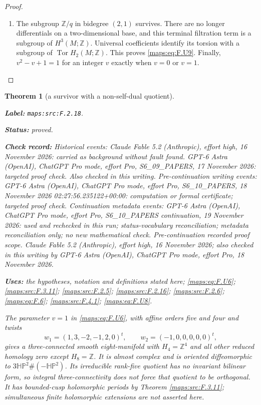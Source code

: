 \documentclass[11pt,a4paper]{article}
\newtheorem{theorem}{Theorem}[section]
\theoremstyle{definition}
\newcommand{\StatementRecord}[4]{\par\smallskip\begingroup\upshape\raggedright\noindent\textbf{Label:} \nolinkurl{#1}.\par\noindent\textbf{Status:} #2.\par\noindent\textbf{Check record:} #3.\par\noindent\textbf{Uses:} #4.\par\endgroup\smallskip}
\begin{document}
\begin{proof}
\begin{enumerate}[label=\arabic*.]
\item The subgroup $\mathbb Z/q$ in bidegree $(2,1)$ survives.
There are no longer differentials on a two-dimensional base,
and this terminal filtration term is a subgroup of
$H^3(M;\mathbb Z)$.  Universal coefficients identify its
torsion with a subgroup of $\operatorname{Tor}H_2(M;\mathbb Z)$.
This proves \eqref{maps:eq:F.U9}.  Finally, $v^2-v+1=1$ for an integer $v$
exactly when $v=0$ or $v=1$.

\end{enumerate}
\end{proof}




\begin{theorem}[a survivor with a non-self-dual quotient]\label{maps:src:F.2.18}
\StatementRecord{maps:src:F.2.18}{proved}{Historical events: Claude Fable 5.2 (Anthropic), effort high, 16 November 2026: carried as background without fault found. GPT-6 Astra (OpenAI), ChatGPT Pro mode, effort Pro, S6\_09\_PAPERS, 17 November 2026: targeted proof check. Also checked in this writing. Pre-continuation writing events: GPT-6 Astra (OpenAI), ChatGPT Pro mode, effort Pro, S6\_10\_PAPERS, 18 November 2026 02:27:56.235122+00:00: computation or formal certificate; targeted proof check. Continuation metadata events: GPT-6 Astra (OpenAI), ChatGPT Pro mode, effort Pro, S6\_10\_PAPERS continuation, 19 November 2026: used and rechecked in this run; status-vocabulary reconciliation; metadata reconciliation only; no new mathematical check. \emph{Pre-continuation recorded proof scope.} Claude Fable 5.2 (Anthropic), effort high, 16 November 2026; also checked in this writing by GPT-6 Astra (OpenAI), ChatGPT Pro mode, effort Pro, 18 November 2026}{the hypotheses, notation and definitions stated here; \cref{maps:eq:F.U6}; \cref{maps:src:F.3.11}; \cref{maps:src:F.2.5}; \cref{maps:src:F.2.16}; \cref{maps:src:F.2.6}; \cref{maps:eq:F.6}; \cref{maps:src:F.4.1}; \cref{maps:eq:F.U8}}


The parameter $v=1$ in \eqref{maps:eq:F.U6}, with affine orders five and four
and twists
\[
 w_1=(1,3,-2,-1,2,0)^t,\qquad
 w_2=(-1,0,0,0,0,0)^t,
\]
gives a three-connected smooth eight-manifold with
$H_4=\mathbb Z^4$ and all other reduced homology zero except
$H_8=\mathbb Z$.  It is almost complex and is oriented
diffeomorphic to $3\mathbb{HP}^2\#(-\mathbb{HP}^2)$.
Its irreducible rank-five quotient has no invariant bilinear
form, so integral three-connectivity does not force that
quotient to be orthogonal.  It has bounded-cusp holomorphic
periods by Theorem \ref{maps:src:F.3.11}; simultaneous finite holomorphic
extensions are not asserted here.

\end{theorem}
\end{document}
